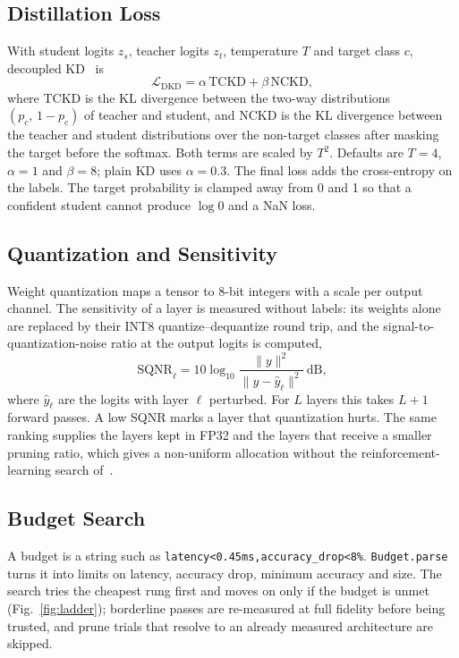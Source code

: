 \documentclass[oneside,a4paper,12pt]{report}
\newcommand{\code}[1]{\texttt{\small #1}}
\begin{document}
\subsection{Distillation Loss}
With student logits $z_s$, teacher logits $z_t$, temperature $T$ and target class $c$, decoupled KD~\cite{zhao2022} is
\begin{equation}
\mathcal{L}_{\mathrm{DKD}} = \alpha\, \mathrm{TCKD} + \beta\, \mathrm{NCKD},
\end{equation}
where TCKD is the KL divergence between the two-way distributions $(p_c,\,1-p_c)$ of teacher and student, and NCKD is the KL divergence between the teacher and student distributions over the non-target classes after masking the target before the softmax. Both terms are scaled by $T^2$. Defaults are $T=4$, $\alpha=1$ and $\beta=8$; plain KD uses $\alpha=0.3$. The final loss adds the cross-entropy on the labels. The target probability is clamped away from 0 and 1 so that a confident student cannot produce $\log 0$ and a NaN loss.

\subsection{Quantization and Sensitivity}
Weight quantization maps a tensor to 8-bit integers with a scale per output channel. The sensitivity of a layer is measured without labels: its weights alone are replaced by their INT8 quantize--dequantize round trip, and the signal-to-quantization-noise ratio at the output logits is computed,
\begin{equation}
\mathrm{SQNR}_\ell = 10\log_{10}\frac{\lVert y\rVert^2}{\lVert y-\hat{y}_\ell\rVert^2}\ \text{dB},
\end{equation}
where $\hat{y}_\ell$ are the logits with layer $\ell$ perturbed. For $L$ layers this takes $L+1$ forward passes. A low SQNR marks a layer that quantization hurts. The same ranking supplies the layers kept in FP32 and the layers that receive a smaller pruning ratio, which gives a non-uniform allocation without the reinforcement-learning search of~\cite{he2018}.

\subsection{Budget Search}\label{sec:budget}
A budget is a string such as \code{latency<0.45ms,accuracy\_drop<8\%}. \code{Budget.parse} turns it into limits on latency, accuracy drop, minimum accuracy and size. The search tries the cheapest rung first and moves on only if the budget is unmet (Fig.~\ref{fig:ladder}); borderline passes are re-measured at full fidelity before being trusted, and prune trials that resolve to an already measured architecture are skipped.
\end{document}

